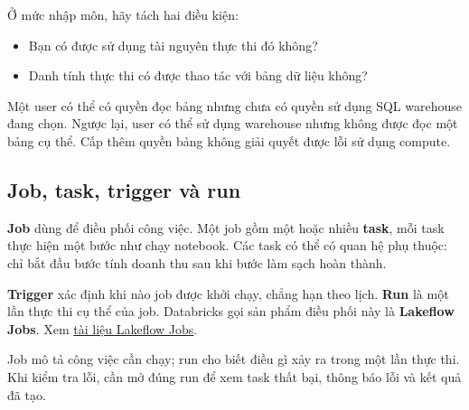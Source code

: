 Ở mức nhập môn, hãy tách hai điều kiện:


\begin{itemize}
\item Bạn có được sử dụng tài nguyên thực thi đó không?
\item Danh tính thực thi có được thao tác với bảng dữ liệu không?
\end{itemize}

Một user có thể có quyền đọc bảng nhưng chưa có quyền sử dụng SQL warehouse đang chọn. Ngược lại, user có thể sử dụng warehouse nhưng không được đọc một bảng cụ thể. Cấp thêm quyền bảng không giải quyết được lỗi sử dụng compute.


\FloatBarrier
{}
\subsection{Job, task, trigger và run}

\textbf{Job} dùng để điều phối công việc. Một job gồm một hoặc nhiều \textbf{task}, mỗi task thực hiện một bước như chạy notebook. Các task có thể có quan hệ phụ thuộc: chỉ bắt đầu bước tính doanh thu sau khi bước làm sạch hoàn thành.


\textbf{Trigger} xác định khi nào job được khởi chạy, chẳng hạn theo lịch. \textbf{Run} là một lần thực thi cụ thể của job. Databricks gọi sản phẩm điều phối này là \textbf{Lakeflow Jobs}. Xem \href{https://docs.databricks.com/aws/en/jobs/}{tài liệu Lakeflow Jobs}.


\begin{figure}[!htbp]
\centering
{}
\begin{figurecardcaptionaivn}
\end{figurecardcaptionaivn}
\end{figure}


Job mô tả công việc cần chạy; run cho biết điều gì xảy ra trong một lần thực thi. Khi kiểm tra lỗi, cần mở đúng run để xem task thất bại, thông báo lỗi và kết quả đã tạo.


